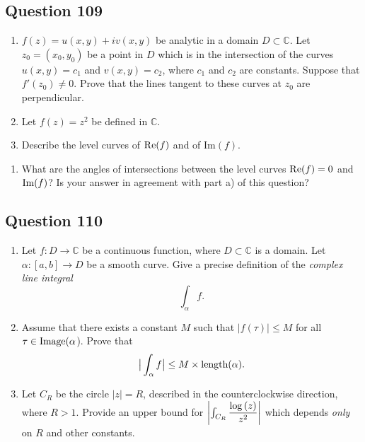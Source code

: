 \documentclass[12pt]{article}
\providecommand{\tightlist}{%
  \setlength{\itemsep}{0pt}\setlength{\parskip}{0pt}}
\begin{document}
\hypertarget{question-109-1}{%
\subsection{Question 109}\label{question-109-1}}

\begin{enumerate}
\def\labelenumi{(\alph{enumi})}
\item
  \(f(z)= u(x,y) +i v(x,y)\) be analytic in a domain
  \(D\subset {\mathbb C}\). Let \(z_0=(x_0,y_0)\) be a point in \(D\)
  which is in the intersection of the curves \(u(x,y)= c_1\) and
  \(v(x,y)=c_2\), where \(c_1\) and \(c_2\) are constants. Suppose that
  \(f'(z_0)\neq 0\). Prove that the lines tangent to these curves at
  \(z_0\) are perpendicular.
\item
  Let \(f(z)=z^2\) be defined in \({\mathbb C}\).
\item
  Describe the level curves of \(\mbox{\textrm Re}{(f)}\) and of
  \(\mbox{Im}{(f)}\).
\end{enumerate}

\begin{enumerate}
\def\labelenumi{(\roman{enumi})}
\setcounter{enumi}{1}
\tightlist
\item
  What are the angles of intersections between the level curves
  \(\mbox{\textrm Re}{(f)}=0\) and \(\mbox{\textrm Im}{(f)}\)? Is your
  answer in agreement with part a) of this question?
\end{enumerate}

\hypertarget{question-110-1}{%
\subsection{Question 110}\label{question-110-1}}

\begin{enumerate}
\def\labelenumi{(\alph{enumi})}
\item
  Let \(f: D\rightarrow \mathbb C\) be a continuous function, where
  \(D\subset \mathbb C\) is a domain. Let \(\alpha:[a,b]\rightarrow D\)
  be a smooth curve. Give a precise definition of the \emph{complex line
  integral} \[\int_{\alpha} f.\]
\item
  Assume that there exists a constant \(M\) such that
  \(|f(\tau)|\leq M\) for all \(\tau\in \mbox{\textrm Image}(\alpha\)).
  Prove that
  \[\big | \int_{\alpha} f \big |\leq M \times \mbox{\textrm length}(\alpha).\]
\item
  Let \(C_R\) be the circle \(|z|=R\), described in the counterclockwise
  direction, where \(R>1\). Provide an upper bound for
  \({\left\lvert { \int_{C_R} \dfrac{\log{(z)} }{z^2} } \right\rvert}\) which depends
  \emph{only} on \(R\) and other constants.
\end{enumerate}
\end{document}
